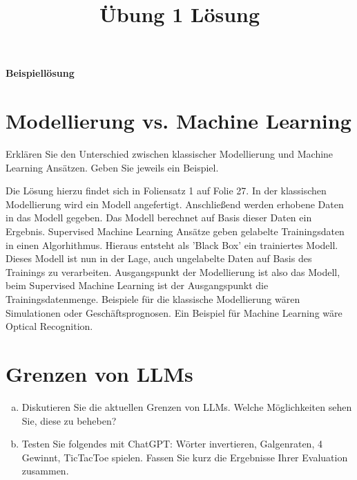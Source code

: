 \documentclass[12pt,ngerman]{AssignmentClass}
\title{Übung 1 Lösung} %
\begin{document}
	\maketitle

    \noindent %
    \begin{tcolorbox}[colback=gray!20, %
                      colframe=gray!20, %
                      boxrule=0pt, %
                      sharp corners, %
                      valign=center, %
                      halign=center, %
                      height=2cm] %
    \LARGE \bfseries Beispiellösung %
    \end{tcolorbox}

    
    \section{Modellierung vs. Machine Learning}
        Erklären Sie den Unterschied zwischen klassischer Modellierung und Machine Learning Ansätzen. Geben Sie jeweils ein Beispiel.

        \vspace{5mm}
        Die Lösung hierzu findet sich in Foliensatz 1 auf Folie 27. In der klassischen Modellierung wird ein Modell angefertigt. Anschließend werden erhobene Daten in das Modell gegeben. Das Modell berechnet auf Basis dieser Daten ein Ergebnis.
        Supervised Machine Learning Ansätze geben gelabelte Trainingsdaten in einen Algorhithmus. Hieraus entsteht als 'Black Box' ein trainiertes Modell. Dieses Modell ist nun in der Lage, auch ungelabelte Daten auf Basis des Trainings zu verarbeiten.
        Ausgangspunkt der Modellierung ist also das Modell, beim Supervised Machine Learning ist der Ausgangspunkt die Trainingsdatenmenge.
        Beispiele für die klassische Modellierung wären Simulationen oder Geschäftsprognosen. Ein Beispiel für Machine Learning wäre Optical Recognition.       


    
    
    \section{Grenzen von LLMs}
        
        \begin{enumerate}[a)]
            \item Diskutieren Sie die aktuellen Grenzen von LLMs. Welche Möglichkeiten sehen Sie, diese zu beheben?
            \item Testen Sie folgendes mit ChatGPT: Wörter invertieren, Galgenraten, 4 Gewinnt, TicTacToe spielen. Fassen Sie kurz die Ergebnisse Ihrer Evaluation zusammen.
        \end{enumerate}
\end{document}
